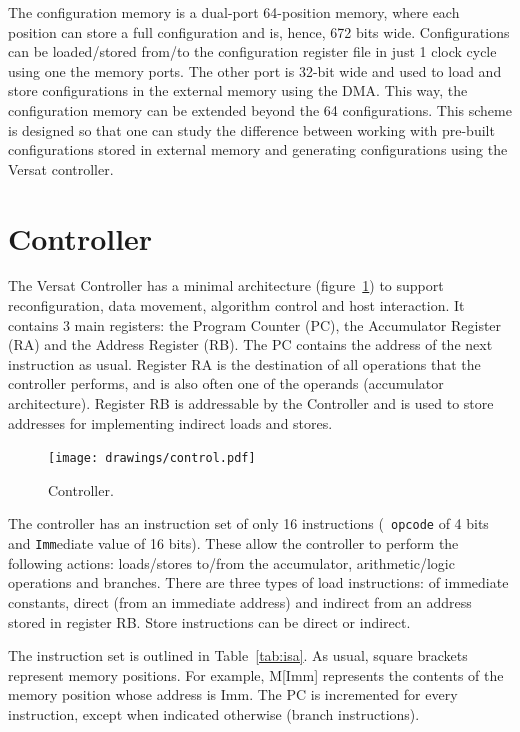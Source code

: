 The configuration memory is a dual-port 64-position memory, where each
position can store a full configuration and is, hence, 672 bits
wide. Configurations can be loaded/stored from/to the configuration
register file in just 1 clock cycle using one the memory ports. The
other port is 32-bit wide and used to load and store configurations in
the external memory using the DMA. This way, the configuration memory
can be extended beyond the 64 configurations. This scheme is designed
so that one can study the difference between working with pre-built
configurations stored in external memory and generating configurations
using the Versat controller.

\section{Controller}
\label{section:controller}

The Versat Controller has a minimal architecture
(figure~\ref{fig_control}) to support reconfiguration, data movement,
algorithm control and host interaction. It contains 3 main registers:
the Program Counter (PC), the Accumulator Register (RA) and the
Address Register (RB). The PC contains the address of the next
instruction as usual. Register RA is the destination of all operations
that the controller performs, and is also often one of the operands
(accumulator architecture). Register RB is addressable by the
Controller and is used to store addresses for implementing indirect
loads and stores.

\begin{figure}[!htb]
\centering \texttt{[image: drawings/control.pdf]}
\caption{Controller.}
\label{fig_control}
\end{figure}

The controller has an instruction set of only 16 instructions ({\tt
  opcode} of 4 bits and {\tt Imm}ediate value of 16 bits). These allow
the controller to perform the following actions: loads/stores to/from
the accumulator, arithmetic/logic operations and branches. There are
three types of load instructions: of immediate constants, direct (from
an immediate address) and indirect from an address stored in register
RB. Store instructions can be direct or indirect.

The instruction set is outlined in Table~\ref{tab:isa}. As usual,
square brackets represent memory positions. For example, M[Imm]
represents the contents of the memory position whose address is
Imm. The PC is incremented for every instruction, except when
indicated otherwise (branch instructions).

